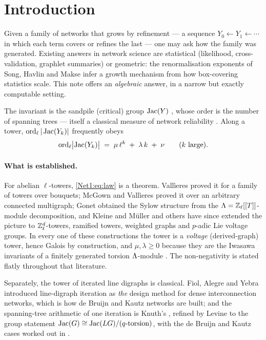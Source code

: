 \section{Introduction}\label{Net1:sec:intro}

Given a family of networks that grows by refinement --- a sequence
$Y_0\leftarrow Y_1\leftarrow\cdots$ in which each term covers or refines the last --- one
may ask how the family was generated. Existing answers in network science are statistical
(likelihood, cross-validation, graphlet summaries) or geometric: the renormalisation
exponents of Song, Havlin and Makse \cite{SHM05,SHM06} infer a growth mechanism from how
box-covering statistics scale. This note offers an \emph{algebraic} answer, in a narrow
but exactly computable setting.

The invariant is the sandpile (critical) group $\operatorname{Jac}(Y)$ \cite{Biggs}, whose order is the
number of spanning trees --- itself a classical measure of network reliability
\cite{Boesch86,Colbourn87,BH09}. Along a tower, $\operatorname{ord}_\ell|\operatorname{Jac}(Y_k)|$ frequently obeys
\begin{equation}\label{Net1:eq:law}
\operatorname{ord}_\ell\bigl|\operatorname{Jac}(Y_k)\bigr|\;=\;\mu\,\ell^{k}\;+\;\lambda\,k\;+\;\nu
\qquad(k\ \text{large}).
\end{equation}

\paragraph{What is established.}
For abelian $\ell$-towers, \eqref{Net1:eq:law} is a theorem. Vall\`ieres \cite{Val21} proved it
for a family of towers over bouquets; McGown and Vall\`ieres \cite{MV24} proved it over an
arbitrary connected multigraph; Gonet \cite{Gonet22} obtained the Sylow structure from the
$\Lambda=\mathbb{Z}_\ell[[T]]$-module decomposition, and Kleine and M\"uller \cite{KM24} and others have
since extended the picture to $\mathbb{Z}_\ell^{d}$-towers, ramified towers, weighted graphs and
$p$-adic Lie voltage groups. In every one of these constructions the tower is a
\emph{voltage} (derived-graph) tower, hence Galois by construction, and
$\mu,\lambda\ge0$ because they are the Iwasawa invariants of a finitely generated torsion
$\Lambda$-module \cite{Washington}. The non-negativity is stated flatly throughout that
literature.

Separately, the tower of iterated line digraphs is classical. Fiol, Alegre and Yebra
\cite{FAY83,FYA84} introduced line-digraph iteration as \emph{the} design method for dense
interconnection networks, which is how de Bruijn and Kautz networks are built; and the
spanning-tree arithmetic of one iteration is Knuth's \cite{Knuth67}, refined by Levine
\cite{Levine11} to the group statement $\operatorname{Jac}(G)\cong\operatorname{Jac}(LG)/(\text{$q$-torsion})$, with the
de Bruijn and Kautz cases worked out in \cite{BK11,CHP15}.

